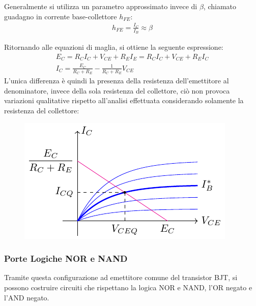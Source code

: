 \documentclass{article}
\numberwithin{equation}{subsection}
\begin{document}
Generalmente si utilizza un parametro approssimato invece di $\beta$, chiamato guadagno in corrente base-collettore $h_{FE}$:
\begin{gather*}
    h_{FE}=\displaystyle\frac{I_C}{I_B}\approx\beta
\end{gather*}

Ritornando alle equazioni di maglia, si ottiene la seguente espressione:
\begin{gather*}
    E_C=R_CI_C+V_{CE}+R_EI_E=R_CI_C+V_{CE}+R_EI_C\\
    I_C=\displaystyle\frac{E_{C}}{R_C+R_E}-\frac{1}{R_C+R_E}V_{CE}
\end{gather*}
L'unica differenza è quindi la presenza della resistenza dell'emettitore al denominatore, invece della sola resistenza del collettore, ciò non 
provoca variazioni qualitative rispetto all'analisi effettuata considerando solamente la resistenza del collettore:
\begin{figure}[H]%
    \centering
    \includegraphics{andamento-collettore-emettitore.pdf}%
    \label{fig:andamento-collettore-emettitore}
\end{figure}

\subsubsection{Porte Logiche NOR e NAND}

Tramite questa configurazione ad emettitore comune del transistor BJT, si possono costruire circuiti che rispettano la logica NOR e NAND, l'OR negato e 
l'AND negato. 
\end{document}
